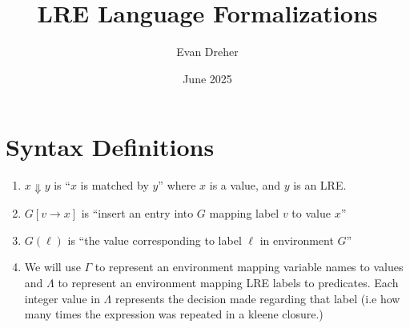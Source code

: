 \documentclass{article}
\author{Evan Dreher}
\title{LRE Language Formalizations}
\date{June 2025}
\newcommand{\gens}{\Downarrow}
\newcommand{\varenv}{\Gamma}
\newcommand{\labenv}{\Lambda}
\begin{document}
\maketitle

\section{Syntax Definitions}
\begin{enumerate}
    \item $x \gens y$ is ``$x$ is matched by $y$'' where $x$ is a value, and $y$ is an LRE.
    \item $G[v \rightarrow x]$ is ``insert an entry into $G$ mapping label $v$ to value $x$''
    \item $G(\ell)$ is ``the value corresponding to label $\ell$ in environment $G$''
    \item We will use $\varenv$ to represent an environment mapping variable names to values and $\labenv$ to represent an environment mapping LRE labels
        to predicates. Each integer value in $\labenv$ represents the decision made regarding that label (i.e how many times the expression was repeated
        in a kleene closure.)
    
\end{enumerate}
\end{document}
